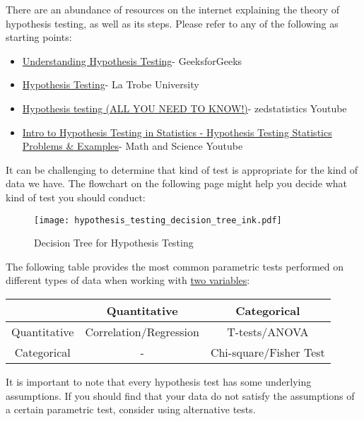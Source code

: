 \documentclass{article}
\begin{document}
There are an abundance of resources on the internet explaining the theory of hypothesis testing, as well as its steps. Please refer to any of the following as starting points:

\begin{itemize}
    \item \href{https://www.geeksforgeeks.org/understanding-hypothesis-testing/}{Understanding Hypothesis Testing}- GeeksforGeeks
    \item \href{https://latrobe.libguides.com/maths/hypothesis-testing}{Hypothesis Testing}- La Trobe University
    \item \href{https://www.youtube.com/watch?v=8JIe_cz6qGA}{Hypothesis testing (ALL YOU NEED TO KNOW!)}- zedstatistics Youtube
    \item \href{https://www.youtube.com/watch?v=VK-rnA3-41c}{Intro to Hypothesis Testing in Statistics - Hypothesis Testing Statistics Problems \& Examples}- Math and Science Youtube
\end{itemize}

It can be challenging to determine that kind of test is appropriate for the kind of data we have. The flowchart on the following page might help you decide what kind of test you should conduct:

\begin{figure}[hbt!]
\texttt{[image: hypothesis\_testing\_decision\_tree\_ink.pdf]}
\caption{\label{fig:hypothesis testing tree}Decision Tree for Hypothesis Testing}
\end{figure}

\newpage
The following table provides the most common parametric tests performed on different types of data when working with \underline{two variables}: 

\begin{center}
\begin{tabular}{ |c|c|c| } 
 \hline
    & Quantitative & Categorical \\ 
    \hline
 Quantitative & Correlation/Regression & T-tests/ANOVA\\ 
 \hline
 Categorical & - & Chi-square/Fisher Test\\ 
 \hline
\end{tabular}
\end{center}

It is important to note that every hypothesis test has some underlying assumptions. If you should find that your data do not satisfy the assumptions of a certain parametric test, consider using alternative tests.
\end{document}
